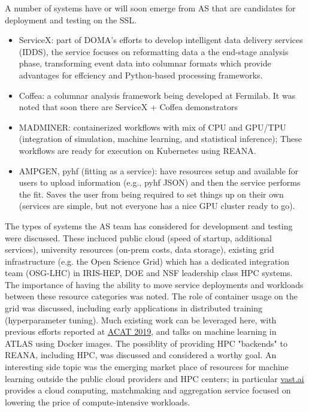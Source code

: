 \documentclass[11pt,letterpaper,fleqn]{article}
\begin{document}
A number of systems have or will soon emerge from AS that are candidates for deployment and testing on the SSL. 

\begin{itemize}
  \item ServiceX: part of DOMA's efforts to develop intelligent data delivery services (IDDS), the service focuses on reformatting data a the end-stage analysis phase, transforming event data into columnar formats which provide advantages for effciency and Python-based processing frameworks. 
  \item Coffea: a columnar analysis framework being developed at Fermilab. It was noted that soon there are ServiceX + Coffea demonstrators
  \item MADMINER: containerized workflows with mix of CPU and GPU/TPU (integration of simulation, machine learning, and statistical inference); These workflows are ready for execution on Kubernetes using REANA. 
  \item AMPGEN, pyhf (fitting as a service): have resources setup and available for users to upload information (e.g., pyhf JSON) and then the service performs the fit. Saves the user from being required to set things up on their own (services are simple, but not everyone has a nice GPU cluster ready to go). 
\end{itemize}


The types of systems the AS team has considered for development and testing were discussed.  These incluced public cloud (speed of startup, additional services), university resources (on-prem costs, data storage), existing grid infrastructure (e.g. the Open Science Grid) which has a dedicated integration team (OSG-LHC) in IRIS-HEP, DOE and NSF leadership class HPC systems.  The importance of having the ability to move service deployments and workloads between these resource categories was noted.
The role of container usage on the grid was discussed, including early applications in distributed training (hyperparameter tuning).  Much existing work can be leveraged here, with previous efforts reported at \href{https://indico.cern.ch/event/708041/}{ACAT 2019}, and talks on machine learning in ATLAS using Docker images.  
The possiblity of providing HPC "backends" to REANA, including HPC, was discussed and considered a worthy goal.  An interesting side topic was the emerging market place of resources for machine learning outside the public cloud providers and HPC centers; in particular \href{Vast.ai}{vast.ai} provides a cloud computing,   matchmaking and aggregation service focused on lowering the price of compute-intensive workloads. 
\end{document}
